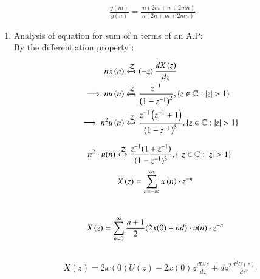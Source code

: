 \documentclass[journal,12pt,twocolumn]{IEEEtran}
\theoremstyle{remark}
\begin{document}
\begin{align} \frac{y(m)}{y(n)}=\frac{m(2m+n+2mn)}{n(2n+m+2mn)}\end{align}
\pagebreak



\begin{enumerate}
 \item Analysis of equation for sum of n terms of an A.P:\\[4pt]
   
 By the differentiation property :

\begin{align}
   n x\left(n\right) &\xleftrightarrow{\mathcal{Z}} \left(-z\right) \frac{dX\left(z\right)}{dz} \\
\implies  n u\left(n\right) &\xleftrightarrow{\mathcal{Z}} \frac{z^{-1}}{\left(1-z^{-1}\right)^2} ,\left\{z\in\mathbb{C} : \lvert z \rvert > 1\right\} \\
\implies     n^2 u\left(n\right)&\xleftrightarrow{\mathcal{Z}}\frac{z^{-1}\left(z^{-1}+1\right)}{\left(1-z^{-1}\right)^3} ,\left\{z\in\mathbb{C} : \lvert z \rvert > 1\right\}\end{align}


\begin{align}
   n^2\cdot u(n)\xleftrightarrow{\mathcal{Z}} \frac{z^{-1}(1+z^{-1})}{(1-z^{-1})^{3}}, {\{\hspace{4pt} {z\in\mathbb{C} : \lvert z \rvert >1}\}} \end{align} \label{eq:diff2}
\begin{align} X\left(z\right) &= \sum_{n=-\infty}^\infty x\left(n\right)\cdot z^{-n}\end{align} \\
\begin{align} X\left(z\right) &= \sum_{n=0}^\infty \frac{n+1}{2}(2x(0)+nd)\cdot{u(n)}\cdot z^{-n}\end{align} \\
\begin{align}
   X(z)=2x(0)U(z)-2x(0)z\frac{dU(z}{dz}+dz^2\frac{d^{2}U(z)}{dz^2}
\end{align}


\end{enumerate}
\end{document}
